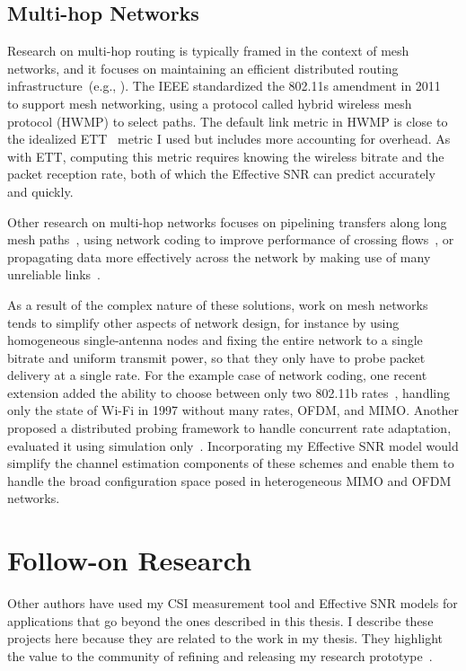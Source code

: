 \subsection{Multi-hop Networks}
Research on multi-hop routing is typically framed in the context of mesh networks, and it focuses on maintaining an efficient distributed routing infrastructure~(e.g., \cite{Athanasiou_Mesh,RFC_AODV,Draves_ETT,Rozner_SOAR}). The IEEE standardized the 802.11s amendment in 2011~\cite{80211s} to support mesh networking, using a protocol called hybrid wireless mesh protocol (HWMP) to select paths. The default link metric in HWMP is close to the idealized ETT~\cite{Draves_ETT} metric I used but includes more accounting for overhead. As with ETT, computing this metric requires knowing the wireless bitrate and the packet reception rate, both of which the Effective SNR can predict accurately and quickly.

Other research on multi-hop networks focuses on pipelining transfers along long mesh paths~\cite{Li_BlockSwitched,Li_Mesh,Rodrig_thesis}, using network coding to improve performance of crossing flows~\cite{Katti_ANC,Katti_XORs,Ni_CodingRates}, or propagating data more effectively across the network by making use of many unreliable links~\cite{Biswas_ExOR}.

As a result of the complex nature of these solutions, work on mesh networks tends to simplify other aspects of network design, for instance by using homogeneous single-antenna nodes and fixing the entire network to a single bitrate and uniform transmit power, so that they only have to probe packet delivery at a single rate. For the example case of network coding, one recent extension added the ability to choose between only two 802.11b rates~\cite{Ni_CodingRates}, handling only the state of Wi-Fi in 1997 without many rates, OFDM, and MIMO. Another proposed a distributed probing framework to handle concurrent rate adaptation, evaluated it using simulation only~\cite{Kim_NetworkCoding}. Incorporating my Effective SNR model would simplify the channel estimation components of these schemes and enable them to handle the broad configuration space posed in heterogeneous MIMO and OFDM networks.

\section{Follow-on Research}
Other authors have used my CSI measurement tool and Effective SNR models for applications that go beyond the ones described in this thesis. I describe these projects here because they are related to the work in my thesis. They highlight the value to the community of refining and releasing my research prototype~\cite{Halperin_csitool}.

